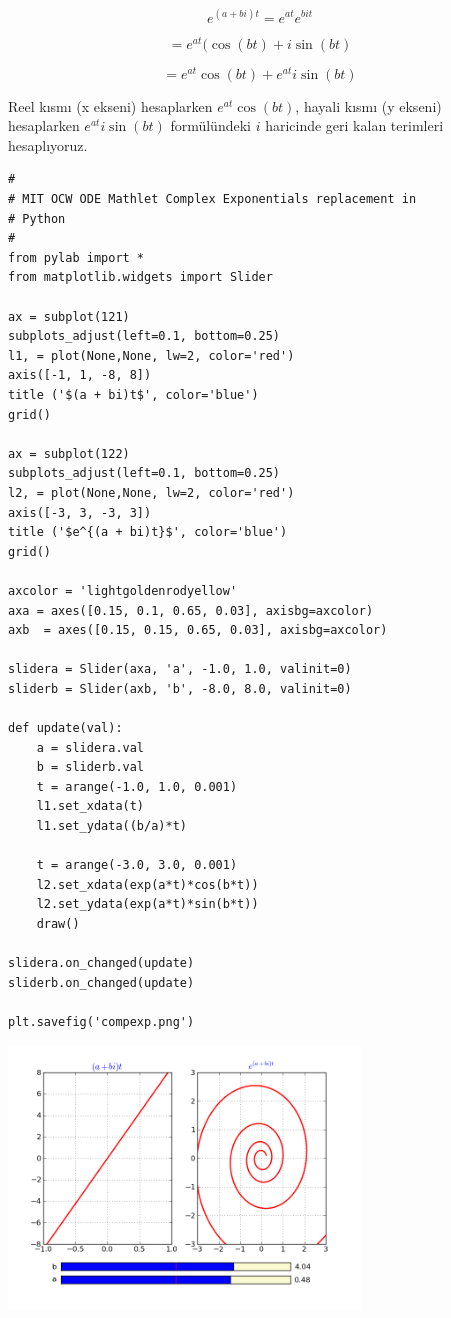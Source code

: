 \documentclass[12pt,fleqn]{article}\usepackage{../../common}
\begin{document}
$$ e^{(a+bi)t} = e^{at} e^{bit}$$

$$ = e^{at} (\cos(bt) + i\sin(bt) $$

$$ = e^{at}\cos(bt) + e^{at} i\sin(bt) $$

Reel kısmı (x ekseni) hesaplarken $e^{at}\cos(bt)$, hayali kısmı (y ekseni)
hesaplarken $e^{at} i\sin(bt)$ formülündeki $i$ haricinde geri kalan terimleri
hesaplıyoruz.

\begin{verbatim}
#
# MIT OCW ODE Mathlet Complex Exponentials replacement in 
# Python
#
from pylab import *
from matplotlib.widgets import Slider

ax = subplot(121)
subplots_adjust(left=0.1, bottom=0.25)
l1, = plot(None,None, lw=2, color='red')
axis([-1, 1, -8, 8])
title ('$(a + bi)t$', color='blue')
grid()

ax = subplot(122)
subplots_adjust(left=0.1, bottom=0.25)
l2, = plot(None,None, lw=2, color='red')
axis([-3, 3, -3, 3])
title ('$e^{(a + bi)t}$', color='blue')
grid()

axcolor = 'lightgoldenrodyellow'
axa = axes([0.15, 0.1, 0.65, 0.03], axisbg=axcolor)
axb  = axes([0.15, 0.15, 0.65, 0.03], axisbg=axcolor)

slidera = Slider(axa, 'a', -1.0, 1.0, valinit=0)
sliderb = Slider(axb, 'b', -8.0, 8.0, valinit=0)

def update(val):
    a = slidera.val
    b = sliderb.val
    t = arange(-1.0, 1.0, 0.001)
    l1.set_xdata(t)
    l1.set_ydata((b/a)*t)

    t = arange(-3.0, 3.0, 0.001)
    l2.set_xdata(exp(a*t)*cos(b*t))
    l2.set_ydata(exp(a*t)*sin(b*t))
    draw()
    
slidera.on_changed(update)
sliderb.on_changed(update)

plt.savefig('compexp.png')
\end{verbatim}

\includegraphics[height=7cm]{compexp.png}
\end{document}
